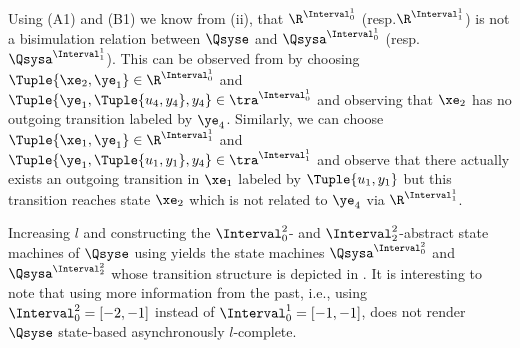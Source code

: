 Using (A1) and (B1) we know from  (ii), that $\R^{\Interval^1_0}$ (resp.$\R^{\Interval^1_1}$) is not a bisimulation relation between $\Qsyse$ and $\Qsysa^{\Interval^1_0}$ (resp. $\Qsysa^{\Interval^1_1}$). This can be observed from  by choosing $\Tuple{\xe_2,\ye_1}\in\R^{\Interval^1_0}$ and $\Tuple{\ye_1,\Tuple{u_4,y_4},y_4}\in\tra^{\Interval^1_0}$ and observing that $\xe_2$ has no outgoing transition labeled by $\ye_4$. Similarly, we can choose  $\Tuple{\xe_1,\ye_1}\in\R^{\Interval^1_1}$ and $\Tuple{\ye_1,\Tuple{u_1,y_1},y_4}\in\tra^{\Interval^1_1}$ and observe that there actually exists an outgoing transition in $\xe_1$ labeled by $\Tuple{u_1,y_1}$ but this transition reaches state $\xe_2$ which is not related to $\ye_4$ via $\R^{\Interval^1_1}$. 







Increasing $l$ and constructing the $\Interval^2_0$- and  $\Interval^2_2$-abstract state machines of $\Qsyse$ using  yields the state machines $\Qsysa^{\Interval^2_0}$ and $\Qsysa^{\Interval^2_2}$ whose transition structure is depicted in . It is interesting to note that using more information from the past, i.e., using $\Interval^2_0=[-2,-1]$ instead of $\Interval^1_0=[-1,-1]$, does not render $\Qsyse$ state-based asynchronously $l$-complete.

